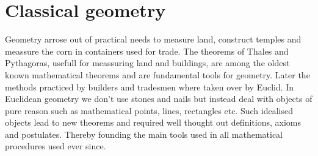 \chapter{Classical geometry}

Geometry arrose out of practical needs to measure land, construct temples and meassure the corn in containers used for trade. The theorems of Thales and Pythagoras, usefull for meassuring land and buildings, are among the oldest known mathematical theorems and are fundamental tools for geometry. Later the methods practiced by builders and tradesmen where taken over by Euclid. In Euclidean geometry we don't use stones and nails but instead deal with objects of pure reason such as mathematical points, lines, rectangles etc. Such idealised objects lead to new theorems and required well thought out definitions, axioms and postulates. Thereby founding the main tools used in all mathematical procedures used ever since.

